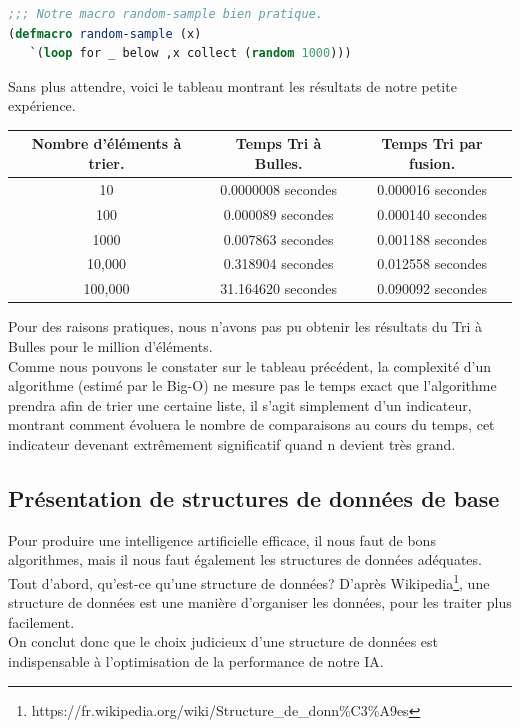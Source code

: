 \documentclass[a4paper, 12pt]{article}
\numberwithin{equation}{subsection}
\begin{document}
\begin{lstlisting}[language=Lisp]
;;; Notre macro random-sample bien pratique.
(defmacro random-sample (x)
   `(loop for _ below ,x collect (random 1000)))
\end{lstlisting}
Sans plus attendre, voici le tableau montrant les résultats de notre petite expérience.
\begin{table}[H]
  \begin{tabular}{|c|c|c|}
    \hline {\bf Nombre d'éléments à trier.} & {\bf Temps Tri à Bulles.} & {\bf Temps Tri par fusion.} \\
    \hline 10 & 0.0000008 secondes & 0.000016 secondes \\
    100 & 0.000089 secondes & 0.000140 secondes \\
    1000 & 0.007863 secondes & 0.001188 secondes \\
    10,000 & 0.318904 secondes & 0.012558 secondes \\
    100,000 & 31.164620 secondes & 0.090092 secondes \\
    \hline
  \end{tabular}
\end{table} \smallskip
Pour des raisons pratiques, nous n'avons pas pu obtenir les résultats du Tri à Bulles pour le million d'éléments. \\

Comme nous pouvons le constater sur le tableau précédent, la complexité d'un algorithme (estimé par le Big-O) ne mesure pas le temps exact que l'algorithme prendra afin de trier une certaine liste, il s'agit simplement d'un indicateur, montrant comment évoluera le nombre de comparaisons au cours du temps, cet indicateur devenant extrêmement significatif quand n devient très grand. \\[0.5cm]
\subsection{Présentation de structures de données de base}
Pour produire une intelligence artificielle efficace, il nous faut de bons algorithmes, mais il nous faut également les structures de données adéquates. \\

Tout d'abord, qu'est-ce qu'une structure de données?
D'après Wikipedia\footnote{https://fr.wikipedia.org/wiki/Structure\_de\_donn\%C3\%A9es}, une structure de données est une manière d'organiser les données, pour les traiter plus facilement. \\
On conclut donc que le choix judicieux d'une structure de données est indispensable à l'optimisation de la performance de notre IA.
\end{document}
